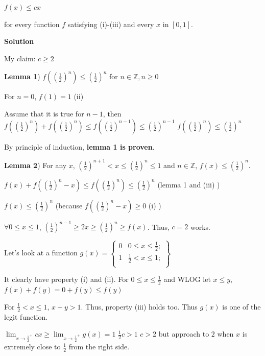 \begin{enumerate}
 $f(x) \le cx$

 for every function $f$ satisfying (i)-(iii) and every $x$ in $[0, 1]$.


 



\textbf{Solution}

My claim: $c\ge2$

 
\textbf{Lemma 1}) $f\left(\left(\frac{1}{2}\right)^n\right)\le\left(\frac{1}{2}\right)^n$ for $n\in \mathbb{Z}, n\ge0$

 For $n=0$, $f(1)=1$ (ii)

 Assume that it is true for $n-1$, then $f\left(\left(\frac{1}{2}\right)^{n}\right)+f\left(\left(\frac{1}{2}\right)^{n}\right)\le f\left(\left(\frac{1}{2}\right)^{n-1}\right)\le \left(\frac{1}{2}\right)^{n-1}$
$f\left(\left(\frac{1}{2}\right)^{n}\right)\le \left(\frac{1}{2}\right)^{n}$

 By principle of induction, \textbf{lemma 1 is proven}.

 
\textbf{Lemma 2}) For any $x$, $\left(\frac{1}{2}\right)^{n+1}<x\le\left(\frac{1}{2}\right)^n\le1$ and $n\in \mathbb{Z}$, $f(x)\le\left(\frac{1}{2}\right)^n$.

 $f(x)+f\left(\left(\frac{1}{2}\right)^n-x\right)\le f\left(\left(\frac{1}{2}\right)^{n}\right)\le \left(\frac{1}{2}\right)^{n}$ (lemma 1 and (iii) )

 $f(x)\le\left(\frac{1}{2}\right)^n$ (because $f\left(\left(\frac{1}{2}\right)^n-x\right)\ge0$ (i) )

 


 $\forall 0\le x\le 1$, $\left(\frac{1}{2}\right)^{n-1}\ge2x\ge \left(\frac{1}{2}\right)^n\ge f(x)$. Thus, $c=2$ works.

 


 Let's look at a function $g(x)=\left\{\begin{array}{ll}0&0\le x\le \frac{1}{2};\\1&\frac{1}{2}<x\le1;\\\end{array}\right\}$

 It clearly have property (i) and (ii). For $0\le x\le\frac{1}{2}$ and WLOG let $x\le y$, $f(x)+f(y)=0+f(y)\le f(y)$

 For $\frac{1}{2}< x\le 1$, $x+y>1$. Thus, property (iii) holds too. Thus $g(x)$ is one of the legit function.

 


 $\lim_{x\rightarrow\frac{1}{2}^+} cx \ge \lim_{x\rightarrow\frac{1}{2}^+} g(x)=1$
$\frac{1}{2}c>1$
$c>2$ but approach to $2$ when $x$ is extremely close to $\frac{1}{2}$ from the right side.


\end{enumerate}
